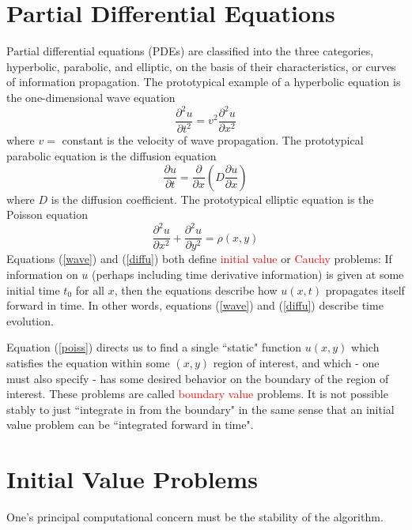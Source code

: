 \documentclass[12pt,a4paper]{article}
\begin{document}
\section{Partial Differential Equations}
\cite{1992nrc.book.....P} Partial differential equations (PDEs) are classified into the three categories, hyperbolic, parabolic, and elliptic, on the basis of their characteristics, or curves of information propagation. The prototypical example of a hyperbolic equation is the one-dimensional wave equation
\begin{equation}
\frac{\partial^2 u}{\partial t^2} = v^2 \frac{\partial^2 u}{\partial x^2}
\label{wave}
\end{equation}
where $v =$ constant is the velocity of wave propagation. The prototypical parabolic equation is the diffusion equation
\begin{equation}
\frac{\partial u}{\partial t} = \frac{\partial}{\partial x} \left(D \frac{\partial u}{\partial x} \right)
\label{diffu}
\end{equation}
where $D$ is the diffusion coefficient. The prototypical elliptic equation is the Poisson equation
\begin{equation}
\frac{\partial^2 u}{\partial x^2} + \frac{\partial^2 u}{\partial y^2} = \rho(x, y)
\label{poiss}
\end{equation}
Equations (\ref{wave}) and (\ref{diffu}) both define \textcolor{red}{initial value} or \textcolor{red}{Cauchy} problems: If information on $u$ (perhaps including time derivative information) is given at some initial time $t_0$ for all $x$, then the equations describe how $u(x,t)$ propagates itself forward in time. In other words, equations (\ref{wave}) and (\ref{diffu}) describe time evolution. 

Equation (\ref{poiss}) directs us to find a single ``static" function $u(x, y)$ which satisfies the equation within some $(x, y)$ region of interest, and which - one must also specify - has some desired behavior on the boundary of the region of interest. These problems are called \textcolor{red}{boundary value} problems. It is not possible stably to just ``integrate in from the boundary" in the same sense that an initial value problem can be ``integrated forward in time".

\section{Initial Value Problems}
One's principal computational concern must be the stability of the algorithm. 
\end{document}
